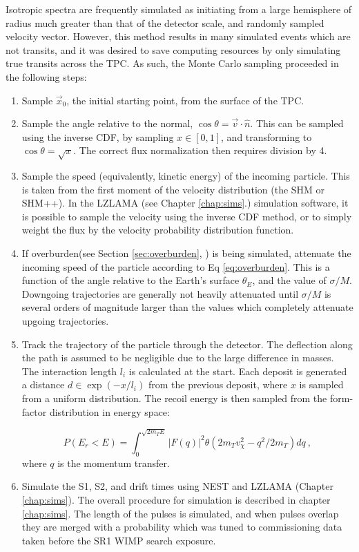 Isotropic spectra are frequently simulated as initiating from a large hemisphere of radius much greater than that of the detector scale, and randomly sampled velocity vector.
However, this method results in many simulated events which are not transits, and it was desired to save computing resources by only simulating true transits across the TPC.
As such, the Monte Carlo sampling proceeded in the following steps:
\begin{enumerate}
    \item Sample $\vec{x}_0$, the initial starting point, from the surface of the TPC.
    \item Sample the angle relative to the normal, $\cos \theta = \vec{v} \cdot \hat{n}$. 
    This can be sampled using the inverse CDF, by sampling $x \in [0,1]$, and transforming to $\cos \theta = \sqrt{x}$.
    The correct flux normalization then requires division by 4.
    \item Sample the speed (equivalently, kinetic energy) of the incoming particle. This is taken from the first moment of the velocity distribution (the SHM\cite{mccabe_earths_2014} or SHM++\cite{evans_refinement_2019}). In the LZLAMA (see Chapter \ref{chap:sims}.) simulation software, it is possible to sample the velocity using the inverse CDF method, or to simply weight the flux by the velocity probability distribution function.
    \item If overburden(see Section \ref{sec:overburden}, \cite{bramante_saturated_2018}) is being simulated, attenuate the incoming speed of the particle according to Eq \ref{eq:overburden}. 
    This is a function of the angle relative to the Earth's surface $\theta_E$, and the value of $\sigma/M$. Downgoing trajectories are generally not heavily attenuated until $\sigma/M$ is several orders of magnitude larger than the values which completely attenuate upgoing trajectories.
    \item Track the trajectory of the particle through the detector.
    The deflection along the path is assumed to be negligible due to the large difference in masses. 
    The interaction length $l_i$ is calculated at the start. Each deposit is generated a distance $d \in \exp(-x/l_i)$ from the previous deposit, where $x$ is sampled from a uniform distribution.
    The recoil energy is then sampled from the form-factor distribution in energy space:
    
    \begin{equation}
        P(E_r < E) = \int_0^{\sqrt{2m_TE}}|F(q)|^2 \theta (2m_T v_\chi^2-q^2 /  2 m_T )dq~,
    \end{equation}
    \noindent
    where $q$ is the momentum transfer.
    \item Simulate the S1, S2, and drift times using NEST\cite{szydagis_nest_2011} and LZLAMA (Chapter \ref{chap:sims}). 
    The overall procedure for simulation is described in chapter \ref{chap:sims}.
    The length of the pulses is simulated, and when pulses overlap they are merged with a probability which was tuned to commissioning data taken before the  SR1 WIMP search exposure.
\end{enumerate}

